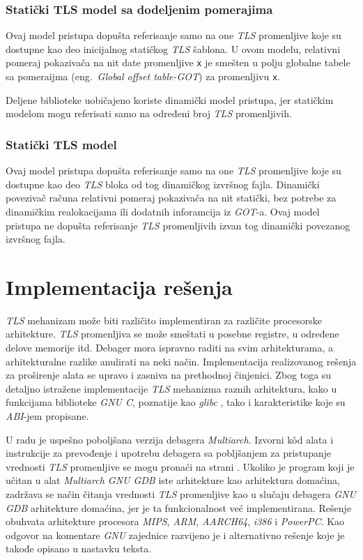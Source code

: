 \documentclass[12pt,oneside]{memoir}
\begin{document}
\subsection{Statički TLS model sa dodeljenim pomerajima}

Ovaj model pristupa dopušta referisanje samo na one \emph{TLS} promenljive koje su dostupne kao deo inicijalnog statičkog \emph{TLS} šablona. U ovom modelu, relativni pomeraj pokazivača na nit date promenljive \texttt{x} je smešten u polju globalne tabele sa pomeraijma (eng.~\emph{Global offset table-GOT}) za promenljivu \texttt{x}.

Deljene biblioteke uobičajeno koriste dinamički model pristupa, jer statičkim modelom mogu referisati samo na određeni broj \emph{TLS} promenljivih.

\subsection{Statički TLS model}

Ovaj model pristupa dopušta referisanje samo na one \emph{TLS} promenljive koje su dostupne kao deo \emph{TLS} bloka od tog dinamičkog izvršnog fajla. Dinamički povezivač računa relativni pomeraj pokazivača na nit statički, bez potrebe za dinamičkim realokacijama ili dodatnih inforamcija iz \emph{GOT}-a. Ovaj model pristupa ne dopušta referisanje \emph{TLS} promenljivih izvan tog dinamički povezanog izvršnog fajla.

\chapter{Implementacija rešenja}
\label{chp:Implementacija}

\emph{TLS} mehanizam može biti različito implementiran za različite procesorske arhitekture. \emph{TLS} promenljiva se može smeštati u posebne registre, u određene delove memorije itd. Debager mora ispravno raditi na svim arhitekturama, a arhitekturalne razlike anulirati na neki način. Implementacija realizovanog rešenja za proširenje alata se upravo i zasniva na prethodnoj činjenici. Zbog toga su detaljno istražene implementacije \emph{TLS} mehanizma raznih arhitektura, kako u funkcijama biblioteke \emph{GNU C}, poznatije kao \emph{glibc} \cite{GLIBC}, tako i karakteristike koje su \emph{ABI}-jem propisane.

U radu je uspešno poboljšana verzija debagera \emph{Multiarch}. Izvorni k\^{o}d alata i instrukcije za prevođenje i upotrebu debagera sa pobljšanjem za pristupanje vrednosti \emph{TLS} promenljive se mogu pronaći na strani \cite{GITMOJ}. Ukoliko je program koji je učitan u alat \emph{Multiarch GNU GDB} iste arhitekture kao arhitektura domaćina, zadržava se način čitanja vrednosti \emph{TLS} promenljive kao u slučaju debagera \emph{GNU GDB} arhitekture domaćina, jer je ta funkcionalnost već implementirana. Rešenje obuhvata arhitekture procesora \emph{MIPS}, \emph{ARM}, \emph{AARCH64}, \emph{i386} i \emph{PowerPC}. Kao odgovor na komentare \emph{GNU} zajednice razvijeno je i alternativno rešenje koje je takođe opisano u nastavku teksta.
\end{document}
